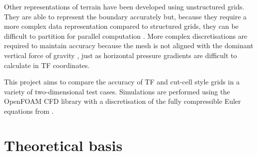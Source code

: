 Other representations of terrain have been developed using unstructured grids.  They are able to represent the boundary accurately but, because they require a more complex data representation compared to structured grids, they can be difficult to partition for parallel computation \autocite{steppeler2003}.  More complex discretisations are required to maintain accuracy because the mesh is not aligned with the dominant vertical force of gravity \autocite{rosatti2005}, just as horizontal pressure gradients are difficult to calculate in TF coordinates.  



This project aims to compare the accuracy of TF and cut-cell style grids in a variety of two-dimensional test cases.  Simulations are performed using the OpenFOAM CFD library \autocite{openfoam} with a discretisation of the fully compressible Euler equations from \textcite{weller-shahrokhi2014}.  


\chapter{Theoretical basis}



